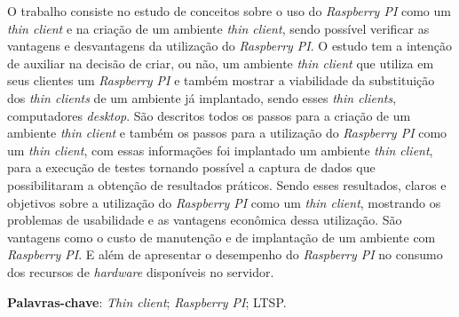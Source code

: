 \documentclass[
	12pt,				%
	openright,			%
	twoside,			%
	a4paper,			%
	chapter=TITLE,		%
	english,			%
	brazil				%
	]{abntex2}
\begin{document}






\setlength{\absparsep}{18pt} %
\begin{resumo}
O trabalho consiste no estudo de conceitos sobre o uso do \textit{Raspberry PI} como um \textit{thin client} e na criação de um ambiente \textit{thin client}, sendo possível verificar as vantagens e desvantagens da utilização do \textit{Raspberry PI}. O estudo tem a intenção de auxiliar na decisão de criar, ou não, um ambiente \textit{thin client} que utiliza em seus clientes um \textit{Raspberry PI} e também mostrar a viabilidade da substituição  dos \textit{thin clients} de um ambiente já implantado, sendo esses \textit{thin clients}, computadores \textit{desktop}. São descritos todos os passos para a criação de um ambiente \textit{thin client} e também os passos para a utilização do \textit{Raspberry PI} como um \textit{thin client}, com essas informações foi implantado um ambiente \textit{thin client}, para a execução de testes tornando possível a captura de dados que possibilitaram a obtenção de resultados práticos. Sendo esses resultados, claros e objetivos sobre a utilização do \textit{Raspberry PI} como um \textit{thin client}, mostrando os problemas de usabilidade e as vantagens econômica dessa utilização. São vantagens como o custo de manutenção e de implantação de um ambiente com \textit{Raspberry PI}. E além de apresentar o desempenho do \textit{Raspberry PI} no consumo dos recursos de \textit{hardware} disponíveis no servidor.


 \textbf{Palavras-chave}: \textit{Thin client}; \textit{Raspberry PI}; LTSP.	%
\end{resumo}
\end{document}
